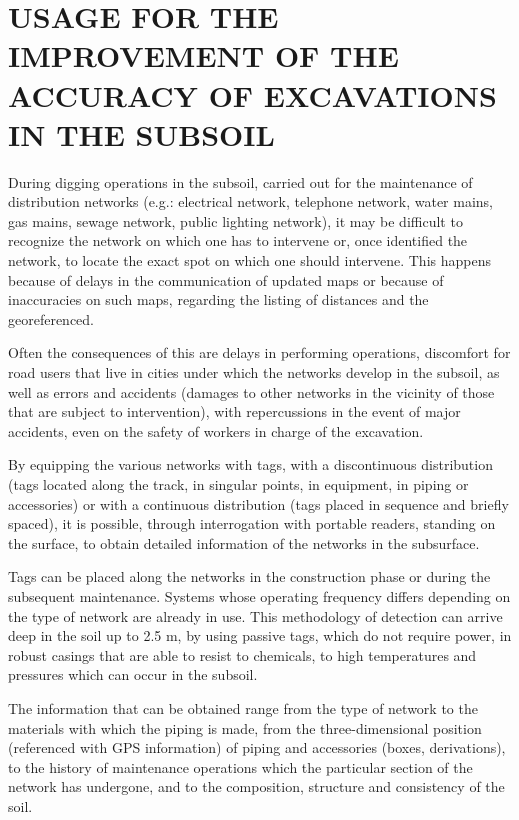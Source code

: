 \section[USAGE FOR THE IMPROVEMENT OF THE ACCURACY OF EXCAVATIONS IN THE SUBSOIL]{\fontsize{14}{12}\selectfont USAGE FOR THE IMPROVEMENT OF THE ACCURACY OF EXCAVATIONS IN THE SUBSOIL}
During digging operations in the subsoil, carried out for the maintenance of distribution networks (e.g.: electrical network, telephone network, water mains, gas mains, sewage network, public lighting network), it may be difficult to recognize the network on which one has to intervene or, once identified the network, to locate the exact spot on which one should intervene. This happens because of delays in the communication of updated maps or because of inaccuracies on such maps, regarding the listing of distances and the georeferenced.  

\vspace{1pc}
Often the consequences of this are delays in performing operations, discomfort for road users that live in cities under which the networks develop in the subsoil, as well as errors and accidents (damages to other networks in the vicinity of those that are subject to intervention), with repercussions in the event of major accidents, even on the safety of workers in charge of the excavation. 

\vspace{1pc}
By equipping the various networks with tags, with a discontinuous distribution (tags located along the track, in singular points, in equipment, in piping or accessories) or with a continuous distribution (tags placed in sequence and briefly spaced), it is possible, through interrogation with portable readers, standing on the surface, to obtain detailed information of the networks in the subsurface.  

\vspace{1pc}
Tags can be placed along the networks in the construction phase or during the subsequent maintenance. Systems whose operating frequency differs depending on the type of network are already in use. This methodology of detection can arrive deep in the soil up to 2.5 m, by using passive tags, which do not require power, in robust casings that are able to resist to chemicals, to high temperatures and pressures which can occur in the subsoil.  

\vspace{1pc}
The information that can be obtained range from the type of network to the materials with which the piping is made, from the three-dimensional position (referenced with GPS information) of piping and accessories (boxes, derivations), to the history of maintenance operations which the particular section of the network has undergone, and to the composition, structure and consistency of the soil. 

